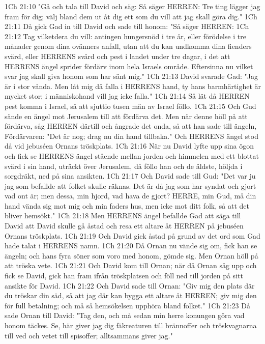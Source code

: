 1Ch 21:10  "Gå och tala till David och säg: Så säger HERREN: Tre ting lägger jag fram för dig; välj bland dem ut åt dig ett som du vill att jag skall göra dig."
1Ch 21:11  Då gick Gad in till David och sade till honom: "Så säger HERREN:
1Ch 21:12  Tag vilketdera du vill: antingen hungersnöd i tre år, eller förödelse i tre månader genom dina ovänners anfall, utan att du kan undkomma dina fienders svärd, eller HERRENS svärd och pest i landet under tre dagar, i det att HERRENS ängel sprider fördärv inom hela Israels område. Eftersinna nu vilket svar jag skall giva honom som har sänt mig."
1Ch 21:13  David svarade Gad: "Jag är i stor vånda. Men låt mig då falla i HERRENS hand, ty hans barmhärtighet är mycket stor; i människohand vill jag icke falla."
1Ch 21:14  Så lät då HERREN pest komma i Israel, så att sjuttio tusen män av Israel föllo.
1Ch 21:15  Och Gud sände en ängel mot Jerusalem till att fördärva det. Men när denne höll på att fördärva, såg HERREN därtill och ångrade det onda, så att han sade till ängeln, Fördärvaren: "Det är nog; drag nu din hand tillbaka." Och HERRENS ängel stod då vid jebuséen Ornans tröskplats.
1Ch 21:16  När nu David lyfte upp sina ögon och fick se HERRENS ängel stående mellan jorden och himmelen med ett blottat svärd i sin hand, uträckt över Jerusalem, då föllo han och de äldste, höljda i sorgdräkt, ned på sina ansikten.
1Ch 21:17  Och David sade till Gud: "Det var ju jag som befallde att folket skulle räknas. Det är då jag som har syndat och gjort vad ont är; men dessa, min hjord, vad hava de gjort? HERRE, min Gud, må din hand vända sig mot mig och min faders hus, men icke mot ditt folk, så att det bliver hemsökt."
1Ch 21:18  Men HERRENS ängel befallde Gad att säga till David att David skulle gå åstad och resa ett altare åt HERREN på jebuséen Ornans tröskplats.
1Ch 21:19  Och David gick åstad på grund av det ord som Gad hade talat i HERRENS namn.
1Ch 21:20  Då Ornan nu vände sig om, fick han se ängeln; och hans fyra söner som voro med honom, gömde sig. Men Ornan höll på att tröska vete.
1Ch 21:21  Och David kom till Ornan; när då Ornan såg upp och fick se David, gick han fram ifrån tröskplatsen och föll ned till jorden på sitt ansikte för David.
1Ch 21:22  Och David sade till Ornan: "Giv mig den plats där du tröskar din säd, så att jag där kan bygga ett altare åt HERREN; giv mig den för full betalning; och må så hemsökelsen upphöra bland folket."
1Ch 21:23  Då sade Ornan till David: "Tag den, och må sedan min herre konungen göra vad honom täckes. Se, här giver jag dig fäkreaturen till brännoffer och tröskvagnarna till ved och vetet till spisoffer; alltsammans giver jag."
